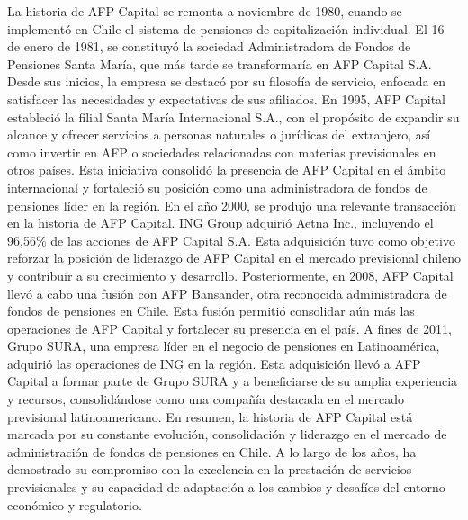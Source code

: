 La historia de AFP Capital se remonta a noviembre de 1980, cuando se implementó en Chile el sistema de pensiones de capitalización individual. El 16 de enero de 1981, se constituyó la sociedad Administradora de Fondos de Pensiones Santa María, que más tarde se transformaría en AFP Capital S.A. Desde sus inicios, la empresa se destacó por su filosofía de servicio, enfocada en satisfacer las necesidades y expectativas de sus afiliados. 
En 1995, AFP Capital estableció la filial Santa María Internacional S.A., con el propósito de expandir su alcance y ofrecer servicios a personas naturales o jurídicas del extranjero, así como invertir en AFP o sociedades relacionadas con materias previsionales en otros países. Esta iniciativa consolidó la presencia de AFP Capital en el ámbito internacional y fortaleció su posición como una administradora de fondos de pensiones líder en la región. 
En el año 2000, se produjo una relevante transacción en la historia de AFP Capital. ING Group adquirió Aetna Inc., incluyendo el 96,56\% de las acciones de AFP Capital S.A. Esta adquisición tuvo como objetivo reforzar la posición de liderazgo de AFP Capital en el mercado previsional chileno y contribuir a su crecimiento y desarrollo. 
Posteriormente, en 2008, AFP Capital llevó a cabo una fusión con AFP Bansander, otra reconocida administradora de fondos de pensiones en Chile. Esta fusión permitió consolidar aún más las operaciones de AFP Capital y fortalecer su presencia en el país. A fines de 2011, Grupo SURA, una empresa líder en el negocio de pensiones en Latinoamérica, adquirió las operaciones de ING en la región. Esta adquisición llevó a AFP Capital a formar parte de Grupo SURA y a beneficiarse de su amplia experiencia y recursos, consolidándose como una compañía destacada en el mercado previsional latinoamericano. En resumen, la historia de AFP Capital está marcada por su constante evolución, consolidación y liderazgo en el mercado de administración de fondos de pensiones en Chile. A lo largo de los años, ha demostrado su compromiso con la excelencia en la prestación de servicios previsionales y su capacidad de adaptación a los cambios y desafíos del entorno económico y regulatorio. 
